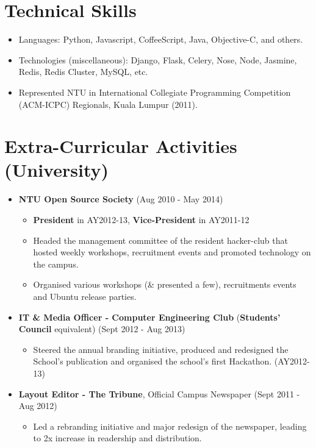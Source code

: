 \section{Technical Skills}\label{technical-skills}

\begin{itemize}
\tightlist
\item
  Languages: Python, Javascript, CoffeeScript, Java, Objective-C, and
  others.
\item
  Technologies (miscellaneous): Django, Flask, Celery, Nose, Node,
  Jasmine, Redis, Redis Cluster, MySQL, etc.
\item
  Represented NTU in International Collegiate Programming Competition
  (ACM-ICPC) Regionals, Kuala Lumpur (2011).
\end{itemize}

\section{Extra-Curricular Activities
(University)}\label{extra-curricular-activities-university}

\begin{itemize}
\tightlist
\item
  \textbf{NTU Open Source Society} \hfill (Aug 2010 - May 2014)

  \begin{itemize}
  \tightlist
  \item
    \textbf{President} in AY2012-13, \textbf{Vice-President} in
    AY2011-12
  \item
    Headed the management committee of the resident hacker-club that
    hosted weekly workshops, recruitment events and promoted technology
    on the campus.
  \item
    Organised various workshops (\& presented a few), recruitments
    events and Ubuntu release parties.
  \end{itemize}
\item
  \textbf{IT \& Media Officer - Computer Engineering Club}
  (\textbf{Students' Council} equivalent) \hfill (Sept 2012 - Aug 2013)

  \begin{itemize}
  \tightlist
  \item
    Steered the annual branding initiative, produced and redesigned the
    School's publication and organised the school's first Hackathon.
    (AY2012-13)
  \end{itemize}
\item
  \textbf{Layout Editor - The Tribune}, Official Campus Newspaper
  \hfill (Sept 2011 - Aug 2012)

  \begin{itemize}
  \tightlist
  \item
    Led a rebranding initiative and major redesign of the newspaper,
    leading to 2x increase in readership and distribution.
  \end{itemize}
\end{itemize}


